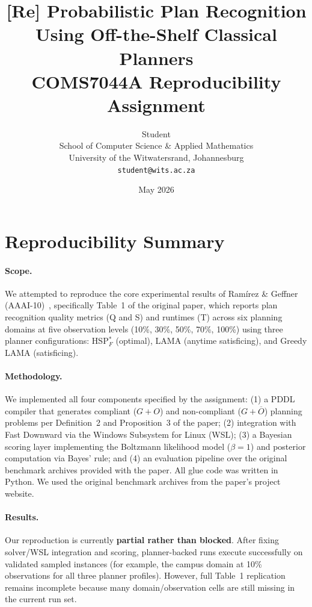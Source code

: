 \documentclass[10pt,twocolumn]{article}
\title{\textbf{[Re] Probabilistic Plan Recognition Using Off-the-Shelf Classical Planners}\\
\large COMS7044A Reproducibility Assignment}
\author{
  Student\\
  School of Computer Science \& Applied Mathematics\\
  University of the Witwatersrand, Johannesburg\\
  \texttt{student@wits.ac.za}
}
\date{May 2026}
\begin{document}
\maketitle

\section*{Reproducibility Summary}

\paragraph{Scope.}
We attempted to reproduce the core experimental results of Ramírez \& Geffner (AAAI-10)~\cite{ramirez2010probabilistic}, specifically Table~1 of the original paper, which reports plan recognition quality metrics (Q and S) and runtimes (T) across six planning domains at five observation levels (10\%, 30\%, 50\%, 70\%, 100\%) using three planner configurations: HSP$^*_F$ (optimal), LAMA (anytime satisficing), and Greedy LAMA (satisficing).

\paragraph{Methodology.}
We implemented all four components specified by the assignment: (1) a PDDL compiler that generates compliant ($G{+}O$) and non-compliant ($G{+}\overline{O}$) planning problems per Definition~2 and Proposition~3 of the paper; (2) integration with Fast Downward via the Windows Subsystem for Linux (WSL); (3) a Bayesian scoring layer implementing the Boltzmann likelihood model ($\beta = 1$) and posterior computation via Bayes' rule; and (4) an evaluation pipeline over the original benchmark archives provided with the paper. All glue code was written in Python. We used the original benchmark archives from the paper's project website.

\paragraph{Results.}
Our reproduction is currently \textbf{partial rather than blocked}. After fixing solver/WSL integration and scoring, planner-backed runs execute successfully on validated sampled instances (for example, the campus domain at 10\% observations for all three planner profiles). However, full Table~1 replication remains incomplete because many domain/observation cells are still missing in the current run set.
\end{document}
